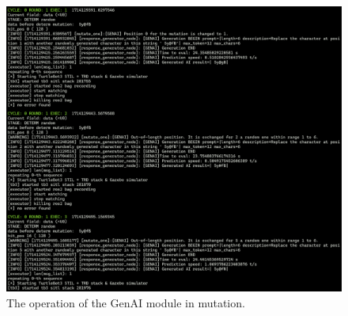 \begin{figure}[ht!]
    \centering
    \includegraphics[width=1\textwidth]{./figures/data/robofuzz_genai_02_fase2_mutaciones.png}
    \caption{The operation of the GenAI module in mutation.}
    \label{fig:robofuzz_genai_02_fase2_mutaciones}
\end{figure}